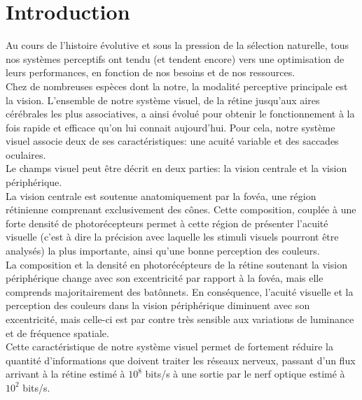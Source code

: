 
\chapter{Introduction} %
\label{Introduction} %


\newcommand{\keyword}[1]{\textbf{#1}}
\newcommand{\tabhead}[1]{\textbf{#1}}
\newcommand{\code}[1]{\texttt{#1}}
\newcommand{\file}[1]{\texttt{\bfseries#1}}
\newcommand{\option}[1]{\texttt{\itshape#1}}


Au cours de l'histoire évolutive et sous la pression de la sélection naturelle, tous nos systèmes perceptifs ont tendu (et tendent encore) vers une optimisation de leurs performances, en fonction de nos besoins et de nos ressources.\\
Chez de nombreuses espèces dont la notre, la modalité perceptive principale est la vision.
L'ensemble de notre système visuel, de la rétine jusqu'aux aires cérébrales les plus associatives, a ainsi évolué pour obtenir le fonctionnement à la fois rapide et efficace qu'on lui connait aujourd'hui.
Pour cela, notre système visuel associe deux de ses caractéristiques: une acuité variable et des saccades oculaires. \autocite{Werner2014}\\

Le champs visuel peut être décrit en deux parties: la vision centrale et la vision périphérique. \autocite{Werner2014}\\
La vision centrale est soutenue anatomiquement par la fovéa, une région rétinienne comprenant exclusivement des cônes. Cette composition, couplée à une forte densité de photorécepteurs permet à cette région de présenter l'acuité visuelle (c'est à dire la précision avec laquelle les stimuli visuels pourront être analysés) la plus importante, ainsi qu'une bonne perception des couleurs. \autocite{Werner2014}\\
La composition et la densité en photorécépteurs de la rétine soutenant la vision périphérique change avec son excentricité par rapport à la fovéa, mais elle comprends majoritairement des batônnets. En conséquence, l'acuité visuelle et la perception des couleurs dans la vision périphérique diminuent avec son excentricité, mais celle-ci est par contre très sensible aux variations de luminance et de fréquence spatiale. \autocite{Werner2014}\\
Cette caractéristique de notre système visuel permet de fortement réduire la quantité d'informations que doivent traiter les réseaux nerveux, passant d'un flux arrivant à la rétine estimé à $10^{8}$ bits/s à une sortie par le nerf optique estimé à $10^{2}$ bits/s. \autocite{Kortum1996, Werner2014, Zhaoping2014}\\

